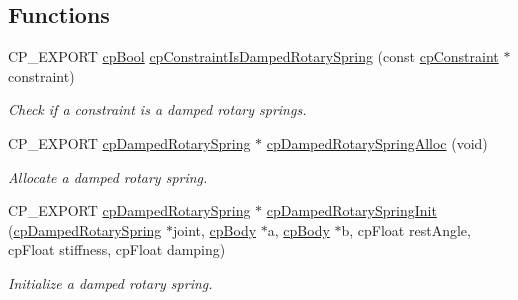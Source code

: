 \subsection*{Functions}
\begin{DoxyCompactItemize}
\item 
\mbox{\label{group__cpDampedRotarySpring_ga699106f2d1aa35ac5ab214c4a5dd5a09}} 
C\+P\+\_\+\+E\+X\+P\+O\+RT \hyperlink{group__basicTypes_gabc5e752c48f3449ca26ef413ecbd647e}{cp\+Bool} \hyperlink{group__cpDampedRotarySpring_ga699106f2d1aa35ac5ab214c4a5dd5a09}{cp\+Constraint\+Is\+Damped\+Rotary\+Spring} (const \hyperlink{structcpConstraint}{cp\+Constraint} $\ast$constraint)
\begin{DoxyCompactList}\small\item\em Check if a constraint is a damped rotary springs. \end{DoxyCompactList}\item 
\mbox{\label{group__cpDampedRotarySpring_gad2795e8d56e06272883862bcbd780115}} 
C\+P\+\_\+\+E\+X\+P\+O\+RT \hyperlink{structcpDampedRotarySpring}{cp\+Damped\+Rotary\+Spring} $\ast$ \hyperlink{group__cpDampedRotarySpring_gad2795e8d56e06272883862bcbd780115}{cp\+Damped\+Rotary\+Spring\+Alloc} (void)
\begin{DoxyCompactList}\small\item\em Allocate a damped rotary spring. \end{DoxyCompactList}\item 
\mbox{\label{group__cpDampedRotarySpring_ga206fae50c75e92adcbd2530586c1f37c}} 
C\+P\+\_\+\+E\+X\+P\+O\+RT \hyperlink{structcpDampedRotarySpring}{cp\+Damped\+Rotary\+Spring} $\ast$ \hyperlink{group__cpDampedRotarySpring_ga206fae50c75e92adcbd2530586c1f37c}{cp\+Damped\+Rotary\+Spring\+Init} (\hyperlink{structcpDampedRotarySpring}{cp\+Damped\+Rotary\+Spring} $\ast$joint, \hyperlink{structcpBody}{cp\+Body} $\ast$a, \hyperlink{structcpBody}{cp\+Body} $\ast$b, cp\+Float rest\+Angle, cp\+Float stiffness, cp\+Float damping)
\begin{DoxyCompactList}\small\item\em Initialize a damped rotary spring. \end{DoxyCompactList}\item 
\mbox{\label{group__cpDampedRotarySpring_gad825660f50d81264b56449b7349e36d6}} 

\end{DoxyCompactItemize}
